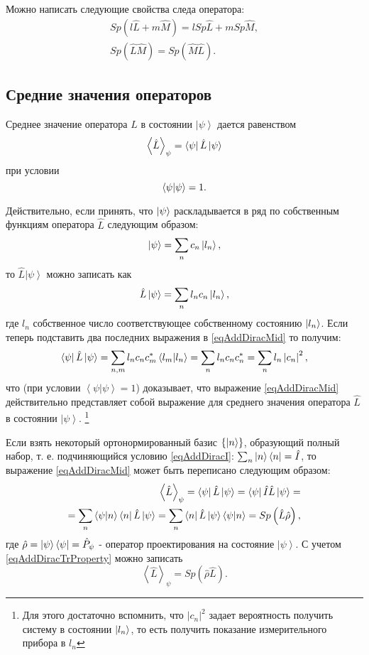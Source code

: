 Можно написать следующие свойства следа оператора:
\begin{eqnarray}
Sp\left(l \hat{L} + m \hat{M}\right) = 
l Sp \hat{L} + m Sp \hat{M},
\nonumber \\
Sp\left(\hat{L}\hat{M}\right) = 
Sp\left(\hat{M}\hat{L}\right).
\label{eqAddDiracTrProperty}
\end{eqnarray}

\subsection{Средние  значения  операторов}
Среднее значение оператора $\hat{L}$   в состоянии $\left| \psi
\right>$  дается равенством 
\begin{equation}  
\left< \hat{L} \right>_{\psi} = \bra{\psi}\hat{L}\ket{\psi}
\label{eqAddDiracMid}
\end{equation}  
при условии
\[
\bra{\psi}\ket{\psi} = 1.
\]

Действительно, если принять, что $\ket{\psi}$ раскладывается в
ряд по собственным функциям оператора $\hat{L}$ следующим образом:
\[
\ket{\psi} = \sum_n c_n \ket{l_n},
\]
то $\hat{L}\left|\psi\right>$ можно записать как
\[
\hat{L}\ket{\psi} = \sum_n l_n c_n \ket{l_n},
\]
где $l_n$ собственное число соответствующее собственному состоянию 
$\ket{l_n}$. 
Если теперь подставить два последних выражения в \eqref{eqAddDiracMid}
то получим:
\[
\bra{\psi}\hat{L}\ket{\psi} = \sum_{n,m} 
l_n c_n c_m^{*} \bra{l_m}\ket{l_n}=
\sum_n l_n c_n c_n^{*} = 
\sum_n l_n \left|c_n\right|^2, 
\]
что (при условии $\left<\psi\right.\left|\psi\right> = 1$) доказывает,
что выражение \eqref{eqAddDiracMid} действительно 
представляет собой выражение для среднего значения оператора 
$\hat{L}$   в состоянии $\left|\psi\right>$.
\footnote{Для этого достаточно вспомнить, что $\left|c_n\right|^2$
  задает вероятность получить систему в состоянии $\ket{l_n}$,
  то есть получить показание измерительного прибора в $l_n$}

Если взять некоторый ортонормированный базис $\{\ket{ n }\}$,
образующий полный набор, т. е. подчиняющийся условию
\eqref{eqAddDiracI}: $\sum_n \ket{ n }\bra{ n } =
\hat{I}$, то выражение \eqref{eqAddDiracMid}
может быть переписано следующим образом:
\begin{eqnarray}
\left< \hat{L} \right>_{\psi} = 
\bra{\psi}\hat{L}\ket{\psi} = 
\bra{\psi}\hat{I}\hat{L}\ket{\psi} = 
\nonumber \\
= 
\sum_n \bra{\psi}\ket{n}\bra{n}
\hat{L}\ket{\psi} = 
\sum_n \bra{n}
\hat{L}\ket{\psi}\bra{\psi}\ket{n} = 
Sp \left(\hat{L} \hat{\rho} \right),
\nonumber
\end{eqnarray}
где 
\(
\hat{\rho} = \ket{\psi}\bra{\psi} = \hat{P}_{\psi}
\) - оператор проектирования на состояние 
$\left| \psi \right>$.
С учетом \eqref{eqAddDiracTrProperty} можно записать
\begin{equation}
\left< \hat{L} \right>_{\psi} = Sp \left(\hat{\rho} \hat{L} \right).
\label{eqAddDiracMidViaRho}
\end{equation}

